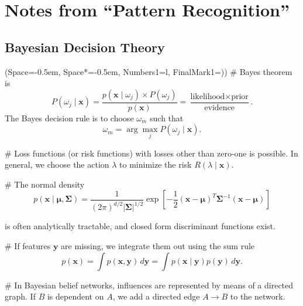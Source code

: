 \documentclass[12pt, a4paper]{article}
\title{\Title}
\author{\Author}
\newcommand{\listSpace}{-0.5em}%
\newcommand{\vect}[1]{\bm{#1}}
\newcommand{\abs}[1]{\left\lvert#1\right\rvert}
\begin{document}
	
\maketitle
\begin{abstract}
This document contains some notes and solutions to the book ``Pattern Classification'' by Duda et al.
\end{abstract}

\tableofcontents

\section{Notes from ``Pattern Recognition''}
\setcounter{subsection}{1}
\subsection{Bayesian Decision Theory}
\begin{easylist}[itemize]
\ListProperties(Space=\listSpace, Space*=\listSpace, Numbers1=l, FinalMark1={)})
# Bayes theorem is
\begin{equation*}
	P(\omega_j \mid \vect{x}) = \frac{p(\vect{x} \mid \omega_j) \times P(\omega_j)}{p(\vect{x})}
	= \frac{\text{likelihood} \times \text{prior}}{\text{evidence}}.
\end{equation*}
The Bayes decision rule is to choose $\omega_m$ such that
\begin{equation*}
	\omega_m = \arg \max_j P(\omega_j \mid \vect{x}).
\end{equation*}

# Loss functions (or risk functions) with losses other than zero-one is possible.
 In general, we choose the action $\lambda$ to minimize the risk $R(\lambda \mid \vect{x})$.
 
# The normal density 
\begin{equation*}
	p(\vect{x} \mid \vect{\mu}, \vect{\Sigma}) = \frac{1}{(2 \pi)^{d/2} \abs{\vect{\Sigma}}^{1/2}} 
	\exp \left[ - \frac{1}{2} 
	\left( \vect{x} - \vect{\mu} \right)^T \vect{\Sigma}^{-1} 
	\left( \vect{x} - \vect{\mu} \right) \right]
\end{equation*}

is often analytically tractable, and closed form discriminant functions exist.

# If features $\vect{y}$ are missing, we integrate them out using the sum rule
\begin{equation*}
	p(\vect{x}) = \int p(\vect{x}, \vect{y}) \, d\vect{y} = \int p(\vect{x} \mid \vect{y}) p(\vect{y}) \, d\vect{y}.
\end{equation*}

# In Bayesian belief networks, influences are represented by means of a directed graph.
If $B$ is dependent on $A$, we add a directed edge $A \to B$ to the network.
\end{easylist}
\end{document}
